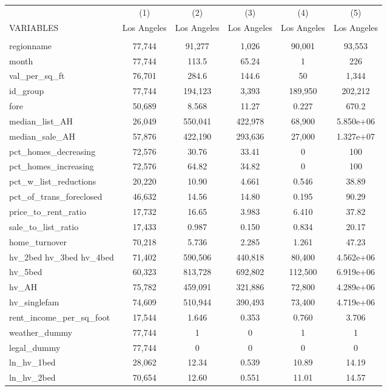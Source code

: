 \begin{tabular}{lccccc} \hline
 & (1) & (2) & (3) & (4) & (5) \\
VARIABLES & Los Angeles & Los Angeles & Los Angeles & Los Angeles & Los Angeles \\ \hline
 &  &  &  &  &  \\
regionname & 77,744 & 91,277 & 1,026 & 90,001 & 93,553 \\
month & 77,744 & 113.5 & 65.24 & 1 & 226 \\
val\_per\_sq\_ft & 76,701 & 284.6 & 144.6 & 50 & 1,344 \\
id\_group & 77,744 & 194,123 & 3,393 & 189,950 & 202,212 \\
fore & 50,689 & 8.568 & 11.27 & 0.227 & 670.2 \\
median\_list\_AH & 26,049 & 550,041 & 422,978 & 68,900 & 5.850e+06 \\
median\_sale\_AH & 57,876 & 422,190 & 293,636 & 27,000 & 1.327e+07 \\
pct\_homes\_decreasing & 72,576 & 30.76 & 33.41 & 0 & 100 \\
pct\_homes\_increasing & 72,576 & 64.82 & 34.82 & 0 & 100 \\
pct\_w\_list\_reductions & 20,220 & 10.90 & 4.661 & 0.546 & 38.89 \\
pct\_of\_trans\_foreclosed & 46,632 & 14.56 & 14.80 & 0.195 & 90.29 \\
price\_to\_rent\_ratio & 17,732 & 16.65 & 3.983 & 6.410 & 37.82 \\
sale\_to\_list\_ratio & 17,433 & 0.987 & 0.150 & 0.834 & 20.17 \\
home\_turnover & 70,218 & 5.736 & 2.285 & 1.261 & 47.23 \\
hv\_2bed 
hv\_3bed 
hv\_4bed & 71,402 & 590,506 & 440,818 & 80,400 & 4.562e+06 \\
hv\_5bed & 60,323 & 813,728 & 692,802 & 112,500 & 6.919e+06 \\
hv\_AH & 75,782 & 459,091 & 321,886 & 72,800 & 4.289e+06 \\
hv\_singlefam & 74,609 & 510,944 & 390,493 & 73,400 & 4.719e+06 \\
rent\_income\_per\_sq\_foot & 17,544 & 1.646 & 0.353 & 0.760 & 3.706 \\
weather\_dummy & 77,744 & 1 & 0 & 1 & 1 \\
legal\_dummy & 77,744 & 0 & 0 & 0 & 0 \\
ln\_hv\_1bed & 28,062 & 12.34 & 0.539 & 10.89 & 14.19 \\
ln\_hv\_2bed & 70,654 & 12.60 & 0.551 & 11.01 & 14.57 \\

\end{tabular}
